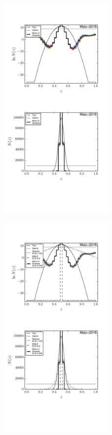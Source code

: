 \documentclass[preprint]{aastex}
\begin{document}
\begin{figure}
\includegraphics[width=0.5\textwidth]{figs/delt/samps.pdf}
\caption{}
\label{fig:toy-samp}
\end{figure}

\begin{figure}
\includegraphics[width=0.5\textwidth]{figs/delt/comps.pdf}
\caption{}
\label{fig:toy-comp}
\end{figure}
\end{document}
